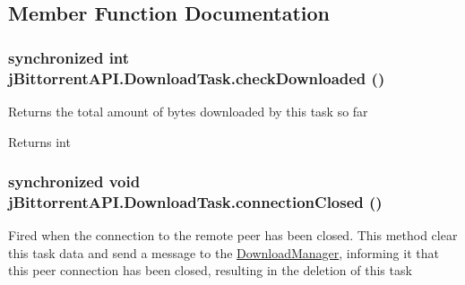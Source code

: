 \subsection{Member Function Documentation}
\hypertarget{classj_bittorrent_a_p_i_1_1_download_task_a3449a9a800c67c5a039a50c8ea1757be}{
\subsubsection[{checkDownloaded}]{\setlength{\rightskip}{0pt plus 5cm}synchronized int jBittorrentAPI.DownloadTask.checkDownloaded ()}}
\label{classj_bittorrent_a_p_i_1_1_download_task_a3449a9a800c67c5a039a50c8ea1757be}
Returns the total amount of bytes downloaded by this task so far \begin{DoxyReturn}{Returns}
int 
\end{DoxyReturn}
\hypertarget{classj_bittorrent_a_p_i_1_1_download_task_aee45e53d98af60717f41840bc5e44c73}{
\subsubsection[{connectionClosed}]{\setlength{\rightskip}{0pt plus 5cm}synchronized void jBittorrentAPI.DownloadTask.connectionClosed ()}}
\label{classj_bittorrent_a_p_i_1_1_download_task_aee45e53d98af60717f41840bc5e44c73}
Fired when the connection to the remote peer has been closed. This method clear this task data and send a message to the \hyperlink{classj_bittorrent_a_p_i_1_1_download_manager}{DownloadManager}, informing it that this peer connection has been closed, resulting in the deletion of this task 


